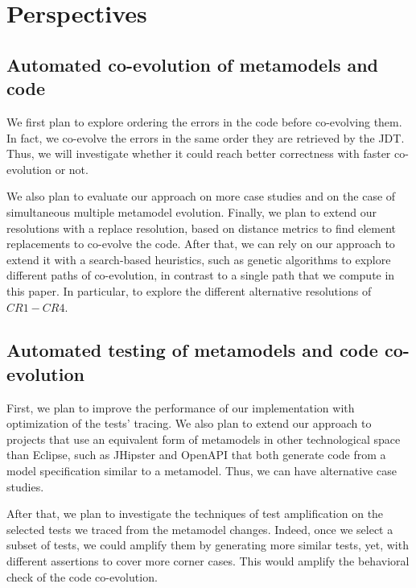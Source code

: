 \section{Perspectives}
\subsection{Automated co-evolution of metamodels and code}
We first plan to explore ordering the errors in the code before co-evolving them. In fact, we co-evolve the errors in the same order they are retrieved by the JDT. Thus, we will investigate whether it could reach better correctness with faster co-evolution or not. 

We also plan to evaluate our approach on more case studies and on the case of simultaneous multiple metamodel evolution. 
%
Finally, we plan to extend our resolutions with a replace resolution, based on distance metrics to find element replacements to co-evolve the code. After that, we can rely on our approach to extend it with a search-based heuristics, such as genetic algorithms to explore different paths of co-evolution, in contrast to a single path that we compute in this paper. In particular, to explore the different alternative resolutions of $CR1-CR4$. 

%
%


\subsection{Automated testing of metamodels and code co-evolution}
First, we plan to improve the performance of our implementation with optimization of the tests' tracing.  %
We also plan to extend our approach to projects that use an equivalent form of metamodels in other technological space than Eclipse, such as JHipster and OpenAPI that both generate code from a model specification similar to a metamodel. Thus, we can have alternative case studies. 

After that, we plan to investigate the techniques of test amplification on the selected tests we traced from the metamodel changes. Indeed, once we select a subset of tests, we could amplify them by generating more similar tests, yet, with different assertions to cover more corner cases. This would amplify the behavioral check of the code co-evolution. 

